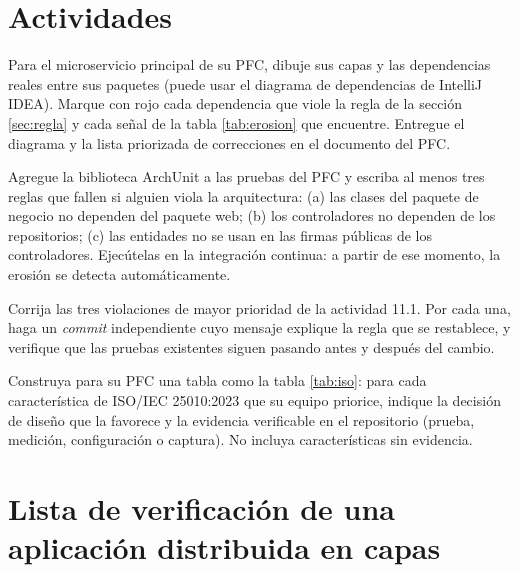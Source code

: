 \section{Actividades}

\begin{practicaBox}[title={Actividad 11.1: diagnóstico de capas del PFC}]
	Para el microservicio principal de su PFC, dibuje sus capas y las dependencias reales entre sus paquetes (puede usar el diagrama de dependencias de IntelliJ IDEA). Marque con rojo cada dependencia que viole la regla de la sección \ref{sec:regla} y cada señal de la tabla \ref{tab:erosion} que encuentre. Entregue el diagrama y la lista priorizada de correcciones en el documento del PFC.
\end{practicaBox}

\begin{practicaBox}[title={Actividad 11.2: reglas de capas como pruebas}]
	Agregue la biblioteca ArchUnit a las pruebas del PFC y escriba al menos tres reglas que fallen si alguien viola la arquitectura: (a) las clases del paquete de negocio no dependen del paquete web; (b) los controladores no dependen de los repositorios; (c) las entidades no se usan en las firmas públicas de los controladores. Ejecútelas en la integración continua: a partir de ese momento, la erosión se detecta automáticamente.
\end{practicaBox}

\begin{practicaBox}[title={Actividad 11.3: refactorización guiada}]
	Corrija las tres violaciones de mayor prioridad de la actividad 11.1. Por cada una, haga un \emph{commit} independiente cuyo mensaje explique la regla que se restablece, y verifique que las pruebas existentes siguen pasando antes y después del cambio.
\end{practicaBox}

\begin{practicaBox}[title={Actividad 11.4: matriz de calidad del PFC}]
	Construya para su PFC una tabla como la tabla \ref{tab:iso}: para cada característica de ISO/IEC 25010:2023 que su equipo priorice, indique la decisión de diseño que la favorece y la evidencia verificable en el repositorio (prueba, medición, configuración o captura). No incluya características sin evidencia.
\end{practicaBox}

\section{Lista de verificación de una aplicación distribuida en capas}

